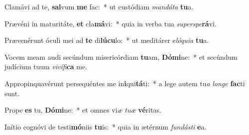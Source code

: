 \item Clamávi ad te, \textbf{sal}vum \textbf{me} fac:~* ut custódiam \textit{man}\textit{dá}\textit{ta} \textbf{tu}a.
\item Prævéni in maturitáte, \textbf{et} cla\textbf{má}vi:~* quia in verba tua \textit{su}\textit{per}\textit{spe}\textbf{rá}vi.
\item Prævenérunt óculi mei ad \textbf{te} di\textbf{lú}\textbf{cu}lo:~* ut meditárer e\textit{ló}\textit{qui}\textit{a} \textbf{tu}a.
\item Vocem meam audi secúndum misericórdiam \textbf{tu}am, \textbf{Dó}\textbf{mi}ne:~* et secúndum judícium tuum \textit{vi}\textit{ví}\textit{fi}\textbf{ca} me.
\item Appropinquavérunt persequéntes me in\textbf{i}qui\textbf{tá}ti:~* a lege autem tu\textit{a} \textit{lon}\textit{ge} \textbf{fac}ti sunt.
\item Prope \textbf{es} tu, \textbf{Dó}\textbf{mi}ne:~* et omnes vi\textit{æ} \textit{tu}\textit{æ} \textbf{vé}ritas.
\item Inítio cognóvi de testi\textbf{mó}niis \textbf{tu}is:~* quia in ætérnum \textit{fun}\textit{dás}\textit{ti} \textbf{e}a.
